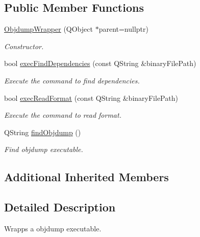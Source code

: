 \subsection*{Public Member Functions}
\begin{DoxyCompactItemize}
\item 
\hyperlink{class_mdt_1_1_deploy_utils_1_1_objdump_wrapper_a6f042e9d1554f14fcc320c2efef16ffa}{Objdump\+Wrapper} (Q\+Object $\ast$parent=nullptr)\hypertarget{class_mdt_1_1_deploy_utils_1_1_objdump_wrapper_a6f042e9d1554f14fcc320c2efef16ffa}{}\label{class_mdt_1_1_deploy_utils_1_1_objdump_wrapper_a6f042e9d1554f14fcc320c2efef16ffa}

\begin{DoxyCompactList}\small\item\em Constructor. \end{DoxyCompactList}\item 
bool \hyperlink{class_mdt_1_1_deploy_utils_1_1_objdump_wrapper_ab97db66a2a9ad2db9932a7c833c11cd1}{exec\+Find\+Dependencies} (const Q\+String \&binary\+File\+Path)
\begin{DoxyCompactList}\small\item\em Execute the command to find dependencies. \end{DoxyCompactList}\item 
bool \hyperlink{class_mdt_1_1_deploy_utils_1_1_objdump_wrapper_a38237494f7027dec851514c7f7179278}{exec\+Read\+Format} (const Q\+String \&binary\+File\+Path)
\begin{DoxyCompactList}\small\item\em Execute the command to read format. \end{DoxyCompactList}\item 
Q\+String \hyperlink{class_mdt_1_1_deploy_utils_1_1_objdump_wrapper_a515708420d15527141d19c365d3f1bd6}{find\+Objdump} ()
\begin{DoxyCompactList}\small\item\em Find objdump executable. \end{DoxyCompactList}\end{DoxyCompactItemize}
\subsection*{Additional Inherited Members}


\subsection{Detailed Description}
Wrapps a objdump executable. 

